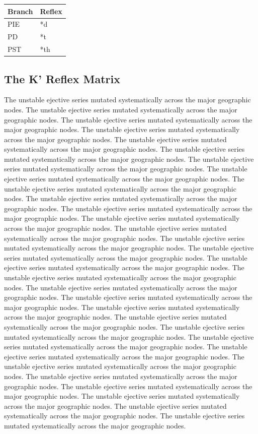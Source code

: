 \begin{table}[h]\centering
\begin{tabular}{ll} \toprule \textbf{Branch} & \textbf{Reflex} \\ \midrule
PIE & *d \\ 
PD & *t \\ 
PST & *th \\ 
\bottomrule \end{tabular}\end{table}

\subsection{The K' Reflex Matrix}
The unstable ejective series mutated systematically across the major geographic nodes. The unstable ejective series mutated systematically across the major geographic nodes. The unstable ejective series mutated systematically across the major geographic nodes. The unstable ejective series mutated systematically across the major geographic nodes. The unstable ejective series mutated systematically across the major geographic nodes. The unstable ejective series mutated systematically across the major geographic nodes. The unstable ejective series mutated systematically across the major geographic nodes. The unstable ejective series mutated systematically across the major geographic nodes. The unstable ejective series mutated systematically across the major geographic nodes. The unstable ejective series mutated systematically across the major geographic nodes. The unstable ejective series mutated systematically across the major geographic nodes. The unstable ejective series mutated systematically across the major geographic nodes. The unstable ejective series mutated systematically across the major geographic nodes. The unstable ejective series mutated systematically across the major geographic nodes. The unstable ejective series mutated systematically across the major geographic nodes. The unstable ejective series mutated systematically across the major geographic nodes. The unstable ejective series mutated systematically across the major geographic nodes. The unstable ejective series mutated systematically across the major geographic nodes. The unstable ejective series mutated systematically across the major geographic nodes. The unstable ejective series mutated systematically across the major geographic nodes. The unstable ejective series mutated systematically across the major geographic nodes. The unstable ejective series mutated systematically across the major geographic nodes. The unstable ejective series mutated systematically across the major geographic nodes. The unstable ejective series mutated systematically across the major geographic nodes. The unstable ejective series mutated systematically across the major geographic nodes. The unstable ejective series mutated systematically across the major geographic nodes. The unstable ejective series mutated systematically across the major geographic nodes. The unstable ejective series mutated systematically across the major geographic nodes. The unstable ejective series mutated systematically across the major geographic nodes. The unstable ejective series mutated systematically across the major geographic nodes. 

